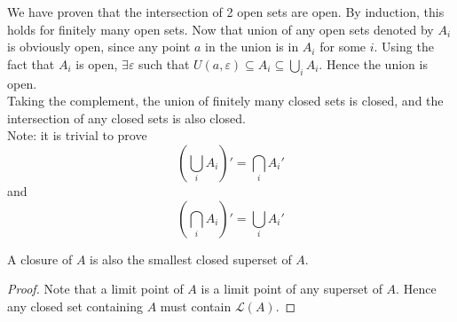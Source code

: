 \documentclass[12pt]{article}
\begin{document}
\begin{rem}
    We have proven that the intersection of 2 open sets are open. By induction, this holds for finitely many open sets. Now that union of any open sets denoted by $A_i$ is obviously open, since any point $a$ in the union is in $A_i$ for some $i$. Using the fact that $A_i$ is open, $\exists \varepsilon$ such that $U(a,\varepsilon) \subseteq A_i \subseteq \bigcup_i A_i$. Hence the union is open. \\
    Taking the complement, the union of finitely many closed sets is closed, and the intersection of any closed sets is also closed. \\
    Note: it is trivial to prove
    $$\left(\bigcup_i A_i\right)' = \bigcap_i A_i'$$
    and
    $$\left(\bigcap_i A_i\right)' = \bigcup_i A_i'$$
\end{rem}

\begin{rem}
    A closure of $A$ is also the smallest closed superset of $A$.
\end{rem}

\begin{proof}
    Note that a limit point of $A$ is a limit point of any superset of $A$. Hence any closed set containing $A$ must contain $\mathcal L(A)$.
\end{proof}
\end{document}
